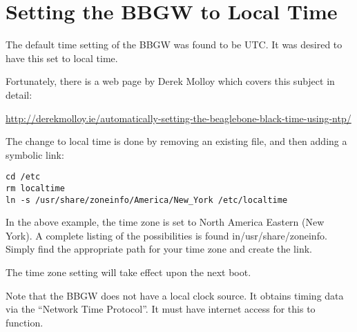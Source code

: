 %
%
%

\chapter{Setting the BBGW to Local Time}

The default time setting of the BBGW was found to be UTC.  It was desired to 
have this set to local time.

Fortunately, there is a web page by Derek Molloy which covers this subject in 
detail:

\url{http://derekmolloy.ie/automatically-setting-the-beaglebone-black-time-using-ntp/}

The change to local time is done by removing an existing file, and then adding 
a symbolic link:

\begin{verbatim}
cd /etc
rm localtime
ln -s /usr/share/zoneinfo/America/New_York /etc/localtime
\end{verbatim}

In the above example, the time zone is set to North America Eastern (New 
York).  A complete listing of the possibilities is found in/usr/share/zoneinfo.
Simply find the appropriate path for your time zone and create the link.

The time zone setting will take effect upon the next boot.

Note that the BBGW does not have a local clock source.  It obtains timing data 
via the ``Network Time Protocol''.  It must have internet access for this to 
function.
